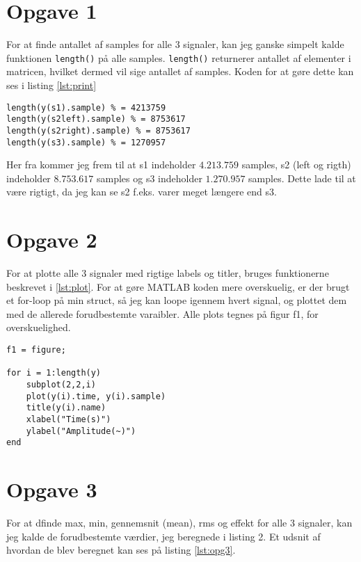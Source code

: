\documentclass[../main.tex]{subfiles}
\begin{document}
\section{Opgave 1}
For at finde antallet af samples for alle 3 signaler, kan jeg ganske simpelt kalde funktionen \lstinline{length()} på alle samples. \lstinline{length()} returnerer antallet af elementer i matricen, hvilket dermed vil sige antallet af samples. Koden for at gøre dette kan ses i listing \ref{lst:print}

\begin{lstlisting}[caption=Print af antal samples, label=lst:print]
length(y(s1).sample) % = 4213759
length(y(s2left).sample) % = 8753617
length(y(s2right).sample) % = 8753617
length(y(s3).sample) % = 1270957
\end{lstlisting}

Her fra kommer jeg frem til at s1 indeholder \(4.213.759\) samples, s2 (left og rigth) indeholder \(8.753.617\) samples og s3 indeholder \(1.270.957\) samples. Dette lade til at være rigtigt, da jeg kan se s2 f.eks. varer meget længere end s3.


\section{Opgave 2}

For at plotte alle 3 signaler med rigtige labels og titler, bruges funktionerne beskrevet i \ref{lst:plot}. For at gøre MATLAB koden mere overskuelig, er der brugt et for-loop på min struct, så jeg kan loope igennem hvert signal, og plottet dem med de allerede forudbestemte varaibler. Alle plots tegnes på figur f1, for overskuelighed.

\begin{lstlisting}[caption={Plot af s1, s2 og s3}, label=lst:plot]
%% Exercise 2
f1 = figure;

for i = 1:length(y)
	subplot(2,2,i)
	plot(y(i).time, y(i).sample)
	title(y(i).name)
	xlabel("Time(s)")
	ylabel("Amplitude(~)")
end
\end{lstlisting}



\section{Opgave 3}

For at dfinde max, min, gennemsnit (mean), rms og effekt for alle 3 signaler, kan jeg kalde de forudbestemte værdier, jeg beregnede i listing 2. Et udsnit af hvordan de blev beregnet kan ses på listing \ref{lst:opg3}. 
\end{document}
